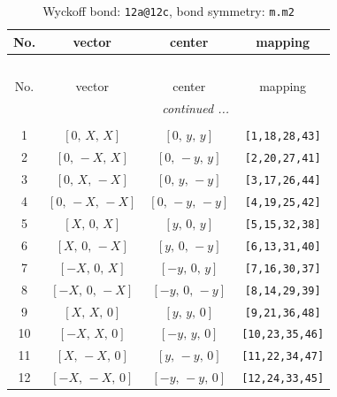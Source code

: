 \documentclass[fleqn,8pt]{jsarticle}
\begin{document}
\begin{longtable}{cccc}
\caption{Wyckoff bond: {\tt 12a@12c}, bond symmetry: {\tt m.m2}}
 \\
 \hline \hline
No. & vector & center & mapping \\ \hline \endfirsthead

\multicolumn{3}{l}{\tablename\ \thetable{}} \\
 \hline \hline
No. & vector & center & mapping \\ \hline \endhead

 \hline \hline
\multicolumn{3}{r}{\footnotesize\it continued ...} \\ \endfoot

 \hline \hline
\multicolumn{3}{r}{} \\ \endlastfoot

1 & $\left[ 0,\, X,\, X \right]$ & $\left[ 0,\, y,\, y \right]$ & {\tt [1,18,28,43]} \\ \hline
2 & $\left[ 0,\, - X,\, X \right]$ & $\left[ 0,\, - y,\, y \right]$ & {\tt [2,20,27,41]} \\ \hline
3 & $\left[ 0,\, X,\, - X \right]$ & $\left[ 0,\, y,\, - y \right]$ & {\tt [3,17,26,44]} \\ \hline
4 & $\left[ 0,\, - X,\, - X \right]$ & $\left[ 0,\, - y,\, - y \right]$ & {\tt [4,19,25,42]} \\ \hline
5 & $\left[ X,\, 0,\, X \right]$ & $\left[ y,\, 0,\, y \right]$ & {\tt [5,15,32,38]} \\ \hline
6 & $\left[ X,\, 0,\, - X \right]$ & $\left[ y,\, 0,\, - y \right]$ & {\tt [6,13,31,40]} \\ \hline
7 & $\left[ - X,\, 0,\, X \right]$ & $\left[ - y,\, 0,\, y \right]$ & {\tt [7,16,30,37]} \\ \hline
8 & $\left[ - X,\, 0,\, - X \right]$ & $\left[ - y,\, 0,\, - y \right]$ & {\tt [8,14,29,39]} \\ \hline
9 & $\left[ X,\, X,\, 0 \right]$ & $\left[ y,\, y,\, 0 \right]$ & {\tt [9,21,36,48]} \\ \hline
10 & $\left[ - X,\, X,\, 0 \right]$ & $\left[ - y,\, y,\, 0 \right]$ & {\tt [10,23,35,46]} \\ \hline
11 & $\left[ X,\, - X,\, 0 \right]$ & $\left[ y,\, - y,\, 0 \right]$ & {\tt [11,22,34,47]} \\ \hline
12 & $\left[ - X,\, - X,\, 0 \right]$ & $\left[ - y,\, - y,\, 0 \right]$ & {\tt [12,24,33,45]} \\
\end{longtable}
\renewcommand{\arraystretch}{1.2}
\end{document}
